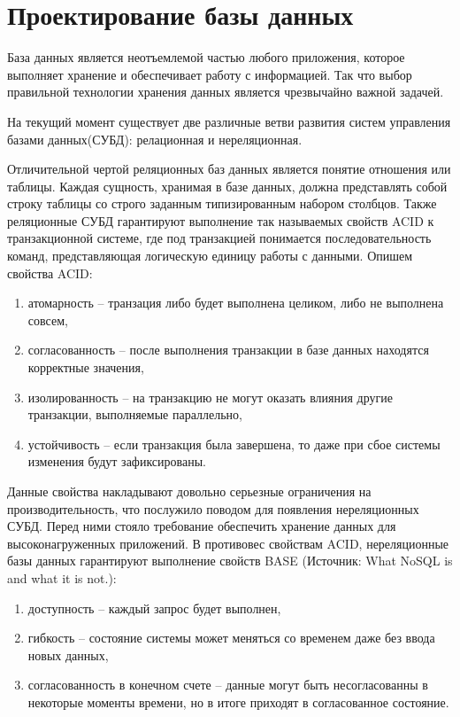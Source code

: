 \section*{Проектирование базы данных}

База данных является неотъемлемой частью любого приложения, которое выполняет
хранение и обеспечивает работу с информацией. Так что выбор правильной технологии
хранения данных является чрезвычайно важной задачей. 

На текущий момент существует две различные ветви развития систем управления
базами данных(СУБД): релационная и нереляционная.

Отличительной чертой реляционных баз данных является понятие отношения или таблицы.
Каждая сущность, хранимая в базе данных, должна представлять собой строку таблицы со 
строго заданным типизированным набором столбцов. Также реляционные СУБД гарантируют
выполнение так называемых свойств ACID к транзакционной системе, где под транзакцией
понимается последовательность команд, представляющая логическую единицу работы с данными.
Опишем свойства ACID: 

\begin{enumerate}
    \item атомарность -- транзация либо будет выполнена целиком, либо
        не выполнена совсем,
    \item согласованность -- после выполнения транзакции в базе данных
        находятся корректные значения,
    \item изолированность -- на транзакцию не могут оказать влияния другие транзакции,
        выполняемые параллельно,
    \item устойчивость -- если транзакция была завершена, то даже при сбое системы
        изменения будут зафиксированы.
\end{enumerate}

Данные свойства накладывают довольно серьезные ограничения на производительность, что
послужило поводом для появления нереляционных СУБД. Перед ними стояло требование
обеспечить хранение данных для высоконагруженных приложений. В противовес
свойствам ACID, нереляционные базы данных гарантируют выполнение свойств BASE
(Источник: What NoSQL is and what it is not.):

\begin{enumerate}
    \item доступность -- каждый запрос будет выполнен,
    \item гибкость -- состояние системы может меняться со временем даже без ввода новых данных,
    \item согласованность в конечном счете -- данные могут быть несогласованны в некоторые
        моменты времени, но в итоге приходят в согласованное состояние.
\end{enumerate}

